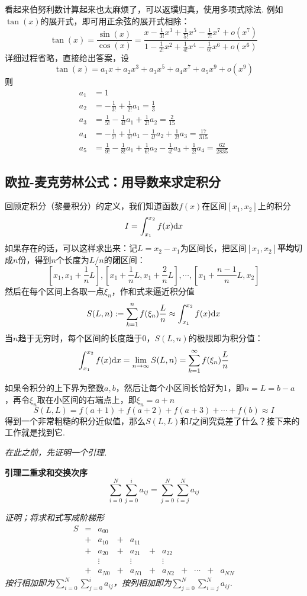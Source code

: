 \documentclass[UTF8]{ctexart}
\newcommand{\trm}[1]{{\rm #1}}
\newenvironment{lemma}[1]
    {\begin{tcolorbox}[enhanced, colback=LightYellow, breakable=true, frame hidden, borderline west={1.5mm}{-2mm}{DarkRed}]
    {\bfseries {\color{DarkRed} 引理}\quad #1} \newline}
    {\end{tcolorbox}}
\begin{document}
看起来伯努利数计算起来也太麻烦了，可以返璞归真，使用多项式除法. 例如\(\tan(x)\)的展开式，即可用正余弦的展开式相除：
\[ \tan(x) = \frac{\sin(x)}{\cos(x)} = \frac{x-\frac{1}{3!}x^3+\frac{1}{5!}x^5-\frac{1}{7!}x^7+o(x^7)} {1-\frac{1}{2!}x^2+\frac{1}{4!}x^4-\frac{1}{6!}x^6+o(x^6)}\]
详细过程省略，直接给出答案，设
\[ \tan(x) = a_1x+a_2x^3+a_3x^5+a_4x^7+a_5x^9+o(x^9)\]
则
\begin{align*}
    a_1 &= 1\\
    a_2 &= -\frac{1}{3!}+\frac{1}{2!}a_1 = \frac{1}{3} \\
    a_3 &= \frac{1}{5!}-\frac{1}{4!}a_1+\frac{1}{2!}a_2 = \frac{2}{15} \\
    a_4 &= -\frac{1}{7!}+\frac{1}{6!}a_1-\frac{1}{4!}a_2+\frac{1}{2!}a_3 = \frac{17}{315} \\
    a_5 &= \frac{1}{9!}-\frac{1}{8!}a_1+\frac{1}{6!}a_2-\frac{1}{4!}a_3+\frac{1}{2!}a_4 = \frac{62}{2835}
\end{align*}

\subsection{欧拉-麦克劳林公式：用导数来求定积分}

回顾定积分（黎曼积分）的定义，我们知道函数\(f(x)\)在区间\([x_1,x_2]\)上的积分
\[I = \int_{x_1}^{x_2} f(x)\trm{d}x\]
如果存在的话，可以这样求出来：记\(L=x_2-x_1\)为区间长，把区间\([x_1,x_2]\)\textbf{平均}切成\(n\)份，得到\(n\)个长度为\(L/n\)的\textbf{闭}区间：
\[[x_1,x_1+\frac{1}{n}L],[x_1+\frac{1}{n}L,x_1+\frac{2}{n}L],\cdots,[x_1+\frac{n-1}{n}L,x_2]\]
然后在每个区间上各取一点\(\xi_n\)，作和式来逼近积分值
\[S(L,n) := \sum_{k=1}^{n}f(\xi_n)\frac{L}{n} \approx \int_{x_1}^{x_2} f(x)\trm{d}x\]
当\(n\)趋于无穷时，每个区间的长度趋于0，\(S(L,n)\)的极限即为积分值：
\[\int_{x_1}^{x_2} f(x)\trm{d}x = \lim_{n\to\infty}S(L,n) = \sum_{k=1}^{\infty}f(\xi_n)\frac{L}{n}\]

如果令积分的上下界为整数\(a,b\)，然后让每个小区间长恰好为1，即\(n=L=b-a\)，再令\(\xi_n\)取在小区间的右端点上，即\(\xi_n=a+n\)
\[S(L,L)=f(a+1)+f(a+2)+f(a+3)+\cdots+f(b) \approx I\]
得到一个非常粗糙的积分近似值，那么\(S(L,L)\)和\(I\)之间究竟差了什么？接下来的工作就是找到它.

\textit{
    在此之前，先证明一个引理.
}

\begin{lemma}{二重求和交换次序}
    \[\sum_{i=0}^{N}\sum_{j=0}^{i}a_{ij}=\sum_{j=0}^{N}\sum_{i=j}^{N}a_{ij}\]
\end{lemma}
\textit{证明；将求和式写成阶梯形}
\[\begin{array}{ccccccccccc}
    S & = & a_{00} &&&&&&&&\\
    & + & a_{10} & + & a_{11} &&&&&&\\
    & + & a_{20} & + & a_{21} & + & a_{22} &&&&\\
    && \vdots && \vdots && \vdots &&&&\\
    & + & a_{N0} & + & a_{N1} & + & a_{N2} & + & \cdots & + & a_{NN}
\end{array}\]
\textit{按行相加即为\(\displaystyle{\sum_{i=0}^{N}\sum_{j=0}^i a_{ij}}\)，按列相加即为\(\displaystyle{\sum_{j=0}^{N}\sum_{i=j}^{N}a_{ij}}\).}
\end{document}
